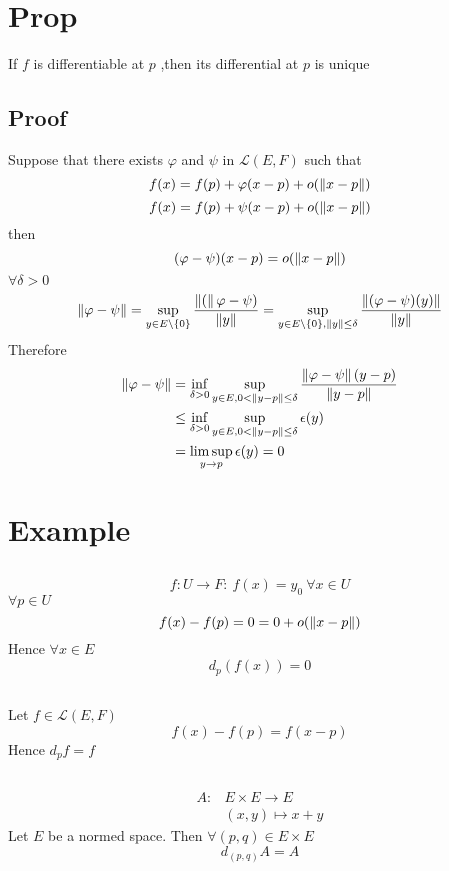 \documentclass{book}
\begin{document}
\section{Prop} If $f$ is differentiable at $p$ ,then its differential at $p$ is unique
\subsection*{Proof}
Suppose that there exists $\varphi$ and $\psi$ in $\mathscr{L}(E,F)$ such that 
$$f(x)=f(p)+\varphi(x-p)+o(\left\lVert x-p \right\rVert)$$
$$f(x)=f(p)+\psi(x-p)+o(\left\lVert x-p \right\rVert)$$
then $$(\varphi-\psi)(x-p)=o(\left\lVert x-p \right\rVert)$$
$\forall \delta>0$
$$\begin{aligned}
    \left\lVert \varphi-\psi \right\rVert= \sup\limits_{y\in E\setminus\{0\}}\frac{\left\lVert ( \right\rVert\varphi-\psi)}{\left\lVert y \right\rVert}=\sup\limits_{y\in E\setminus\{0\},\left\lVert y \right\rVert\leq\delta}\frac{\left\lVert (\varphi-\psi)(y) \right\rVert}{\left\lVert y \right\rVert}
\end{aligned}$$
Therefore $$
\begin{aligned}
    \left\lVert \varphi-\psi \right\rVert &=\inf\limits_{\delta>0}\sup\limits_{y\in E,0<\left\lVert y-p \right\rVert\leq\delta}\frac{\left\lVert \varphi-\psi \right\rVert(y-p)}{\left\lVert y-p \right\rVert}\\
    &\leq\inf\limits_{\delta>0}\sup\limits_{y\in E,0<\left\lVert y-p \right\rVert\leq\delta}\epsilon(y)\\
    &=\limsup\limits_{y\rightarrow p} \epsilon(y)=0
\end{aligned}$$
\section{Example}
\subsection{}
$$f:U\rightarrow F:\ f(x)=y_0\ \forall x\in U$$
$\forall p\in U$
$$f(x)-f(p)=0=0+o(\left\lVert x-p \right\rVert)$$
Hence $\forall x\in E$
$$d_p(f(x))=0$$
\subsection{}
Let $f\in \mathscr{L}(E,F)$
$$f(x)-f(p)=f(x-p)$$
Hence $d_pf=f$
\subsection{}
$$\begin{aligned}
    A:& E\times E\rightarrow E\\
    &(x,y)\mapsto x+y
\end{aligned}$$
Let $E$ be a normed space.
Then $\forall (p,q)\in E\times E$$$d_{(p,q)}A=A$$
\end{document}
